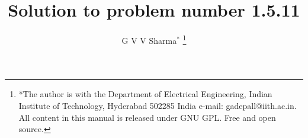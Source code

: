 \documentclass[journal,12pt,twocolumn]{IEEEtran}
\theoremstyle{remark}
\begin{document}
%




\vspace{3cm}

\title{
    Solution to problem number 1.5.11
}
\author{ G V V Sharma$^{*}$%
	\thanks{*The author is with the Department
		of Electrical Engineering, Indian Institute of Technology, Hyderabad
		502285 India e-mail:  gadepall@iith.ac.in. All content in this manual is released under GNU GPL.  Free and open source.}	
}


%
%
%

% 
%



% 
\end{document}
